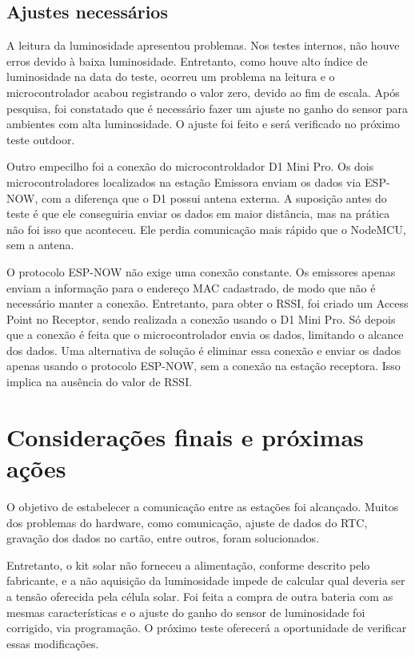 \documentclass[11pt,a4paper]{article}
\begin{document}
\subsection{Ajustes necessários}
\label{sec:ajustes}

A leitura da luminosidade apresentou problemas. Nos testes internos, não houve erros devido à baixa luminosidade. Entretanto, como houve alto índice de luminosidade na data do teste, ocorreu um problema na leitura e o microcontrolador acabou registrando o valor zero, devido ao fim de escala. Após pesquisa, foi constatado que é necessário fazer um ajuste no ganho do sensor para ambientes com alta luminosidade. O ajuste foi feito e será verificado no próximo teste outdoor.

Outro empecilho foi a conexão do microcontroldador D1 Mini Pro. Os dois microcontroladores localizados na estação Emissora enviam os dados via ESP-NOW, com a diferença que o D1 possui antena externa. A suposição antes do teste é que ele conseguiria enviar os dados em maior distância, mas na prática não foi isso que aconteceu. Ele perdia comunicação mais rápido que o NodeMCU, sem a antena.

O protocolo ESP-NOW não exige uma conexão constante. Os emissores apenas enviam a informação para o endereço MAC cadastrado, de modo que não é necessário manter a conexão. Entretanto, para obter o RSSI, foi criado um Access Point no Receptor, sendo realizada a conexão usando o D1 Mini Pro. Só depois que a conexão é feita que o microcontrolador envia os dados, limitando o alcance dos dados. Uma alternativa de solução é eliminar essa conexão e enviar os dados apenas usando o protocolo ESP-NOW, sem a conexão na estação receptora. Isso implica na ausência do valor de RSSI.

\section{Considerações finais e próximas ações}

O objetivo de estabelecer a comunicação entre as estações foi alcançado. Muitos dos problemas do hardware, como comunicação, ajuste de dados do RTC, gravação dos dados no cartão, entre outros, foram solucionados.

Entretanto, o kit solar não forneceu a alimentação, conforme descrito pelo fabricante, e a não aquisição da luminosidade impede de calcular qual deveria ser a tensão oferecida pela célula solar. Foi feita a compra de outra bateria com as mesmas características e o ajuste do ganho do sensor de luminosidade foi corrigido, via programação. O próximo teste oferecerá a oportunidade de verificar essas modificações.
\end{document}
